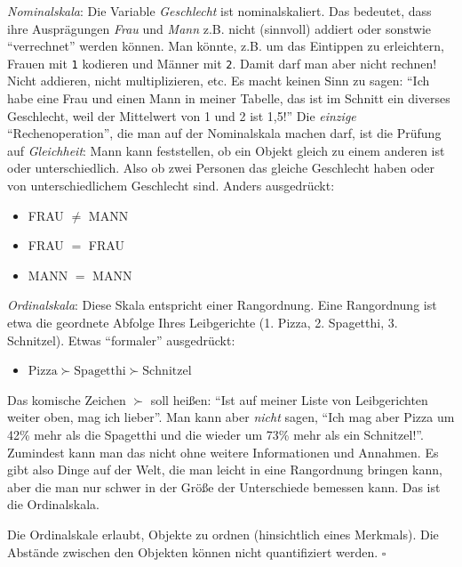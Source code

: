 \documentclass[
  letterpaper,
]{scrbook}
\providecommand{\tightlist}{%
  \setlength{\itemsep}{0pt}\setlength{\parskip}{0pt}}\usepackage{longtable,booktabs,array}
\theoremstyle{definition}
\theoremstyle{definition}
\theoremstyle{definition}
\theoremstyle{remark}
\begin{document}
\emph{Nominalskala}: Die Variable \emph{Geschlecht} ist nominalskaliert.
Das bedeutet, dass ihre Ausprägungen \emph{Frau} und \emph{Mann} z.B.
nicht (sinnvoll) addiert oder sonstwie \enquote{verrechnet} werden
können. Man könnte, z.B. um das Eintippen zu erleichtern, Frauen mit
\texttt{1} kodieren und Männer mit \texttt{2}. Damit darf man aber nicht
rechnen! Nicht addieren, nicht multiplizieren, etc. Es macht keinen Sinn
zu sagen: \enquote{Ich habe eine Frau und einen Mann in meiner Tabelle,
das ist im Schnitt ein diverses Geschlecht, weil der Mittelwert von 1
und 2 ist 1,5!} Die \emph{einzige} \enquote{Rechenoperation}, die man
auf der Nominalskala machen darf, ist die Prüfung auf \emph{Gleichheit}:
Mann kann feststellen, ob ein Objekt gleich zu einem anderen ist oder
unterschiedlich. Also ob zwei Personen das gleiche Geschlecht haben oder
von unterschiedlichem Geschlecht sind. Anders ausgedrückt:

\begin{itemize}
\tightlist
\item
  FRAU \(\ne\) MANN
\item
  FRAU \(=\) FRAU
\item
  MANN \(=\) MANN
\end{itemize}

\emph{Ordinalskala}: Diese Skala entspricht einer Rangordnung. Eine
Rangordnung ist etwa die geordnete Abfolge Ihres Leibgerichte (1. Pizza,
2. Spagetthi, 3. Schnitzel). Etwas \enquote{formaler} ausgedrückt:

\begin{itemize}
\tightlist
\item
  \(\text{Pizza} \succ \text{Spagetthi} \succ \text{Schnitzel}\)
\end{itemize}

Das komische Zeichen \(\succ\) soll heißen: \enquote{Ist auf meiner
Liste von Leibgerichten weiter oben, mag ich lieber}. Man kann aber
\emph{nicht} sagen, \enquote{Ich mag aber Pizza um 42\% mehr als die
Spagetthi und die wieder um 73\% mehr als ein Schnitzel!}. Zumindest
kann man das nicht ohne weitere Informationen und Annahmen. Es gibt also
Dinge auf der Welt, die man leicht in eine Rangordnung bringen kann,
aber die man nur schwer in der Größe der Unterschiede bemessen kann. Das
ist die Ordinalskala.

\begin{tcolorbox}[enhanced jigsaw, colbacktitle=quarto-callout-important-color!10!white, toptitle=1mm, colframe=quarto-callout-important-color-frame, breakable, toprule=.15mm, bottomrule=.15mm, bottomtitle=1mm, left=2mm, opacitybacktitle=0.6, colback=white, arc=.35mm, coltitle=black, title=\textcolor{quarto-callout-important-color}{\faExclamation}\hspace{0.5em}{Wichtig}, opacityback=0, rightrule=.15mm, leftrule=.75mm, titlerule=0mm]

Die Ordinalskale erlaubt, Objekte zu ordnen (hinsichtlich eines
Merkmals). Die Abstände zwischen den Objekten können nicht quantifiziert
werden. \(\square\)

\end{tcolorbox}
\end{document}
